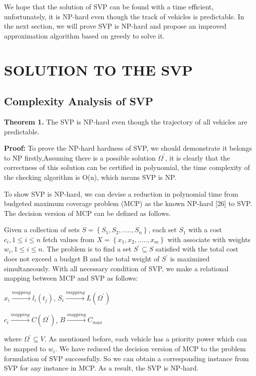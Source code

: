 \documentclass[journal]{IEEEtran}
\begin{document}
We hope that the solution of SVP can be found with a time efficient, unfortunately, it is NP-hard even though the track of vehicles is predictable. In the next section, we will prove SVP is NP-hard and propose an improved approximation algorithm based on greedy to solve it.
\section{SOLUTION TO THE SVP}
\subsection{Complexity Analysis of SVP}
\noindent
\textbf{Theorem 1.} The SVP is NP-hard even though the trajectory of all vehicles are predictable.

\noindent
\textbf{Proof:} To prove the NP-hard hardness of SVP, we should demonstrate it belongs to NP firstly,Assuming there is a possible solution $\Omega ^{'}$, it is clearly that the correctness of this solution can be certified in polynomial, the time complexity of the checking algorithm is O(n), which means SVP is NP.

To show SVP is NP-hard, we can devise a reduction in polynomial time from budgeted maximum coverage problem (MCP) as the known NP-hard [26] to SVP. The decision version of MCP can be defined as follows. 

Given a collection of sets $S=\left \{ S_{1},S_{2},.....,S_{n} \right \}$, each set $S_{1}$ with a cost  $c_{i},1\leqslant i\leqslant n$ fetch values from $X=\left \{ x_{1},x_{2},.....,x_{m} \right \} $ with associate with weights $w_{i},1\leqslant i\leqslant n$. The problem is to find a set $S^{'}\subseteq S$ satisfied with the total cost does not exceed a budget B and the total weight of $S^{'}$ is maximized simultaneously.
With all necessary condition of SVP, we make a relational mapping between MCP and SVP as follows:
\begin{center}
$x_{i}\overset{mapping}{\rightarrow}l_{i}(t_{j})$,
$S_{i}\overset{mapping}{\rightarrow}L({\Omega ^{'}})$	
\end{center}
\begin{center}
$c_{i}\overset{mapping}{\rightarrow}C({\Omega ^{'}})$,
$B\overset{mapping}{\rightarrow}C_{max}$
\end{center}
where $\Omega ^{'}\subseteq V$. As mentioned before, each vehicle has a priority power which can be mapped to  $w_{i}$. We have reduced the decision version of MCP to the problem formulation of SVP successfully. So we can obtain a corresponding instance from SVP for any instance in MCP. As a result, the SVP is NP-hard.
\end{document}
